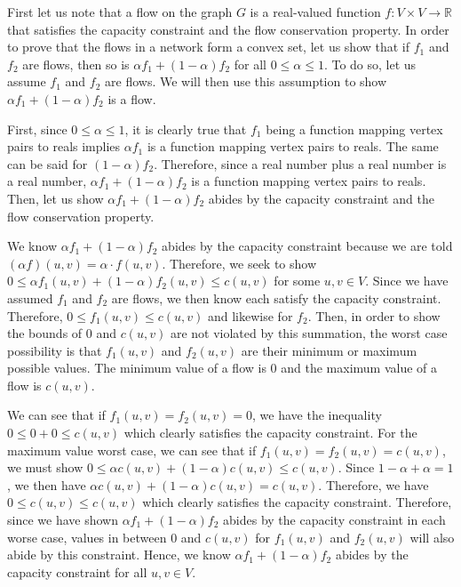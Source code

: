 \documentclass[11pt]{article}
\begin{document}
First let us note that a flow on the graph $G$ is a real-valued function $f : V \times V \rightarrow \mathbb{R}$ that satisfies the capacity constraint and the flow conservation property. In order to prove that the flows in a network form a convex set, let us show that if $f_1$ and $f_2$ are flows, then so is $\alpha f_1 + (1-\alpha) f_2$ for all $0 \leq \alpha \leq 1$. To do so, let us assume $f_1$ and $f_2$ are flows. We will then use this assumption to show $\alpha f_1 + (1-\alpha) f_2$ is a flow.

First, since $0 \leq \alpha \leq 1$, it is clearly true that $f_1$ being a function mapping vertex pairs to reals implies $\alpha f_1$ is a function mapping vertex pairs to reals. The same can be said for $(1-\alpha)f_2$. Therefore, since a real number plus a real number is a real number, $\alpha f_1 + (1-\alpha) f_2$ is a function mapping vertex pairs to reals. Then, let us show $\alpha f_1 + (1-\alpha) f_2$ abides by the capacity constraint and the flow conservation property.

We know $\alpha f_1 + (1-\alpha) f_2$ abides by the capacity constraint because we are told $(\alpha f)(u,v) = \alpha \cdot f(u,v)$. Therefore, we seek to show $0 \leq \alpha f_1(u,v) + (1-\alpha)f_2(u,v) \leq c(u,v)$ for some $u,v \in V$. Since we have assumed $f_1$ and $f_2$ are flows, we then know each satisfy the capacity constraint. Therefore, $0 \leq f_1(u,v) \leq c(u,v)$ and likewise for $f_2$. Then, in order to show the bounds of 0 and $c(u,v)$ are not violated by this summation, the worst case possibility is that $f_1(u,v)$ and $f_2(u,v)$ are their minimum or maximum possible values. The minimum value of a flow is 0 and the maximum value of a flow is $c(u,v)$.

We can see that if $f_1(u,v) = f_2(u,v) = 0$, we have the inequality $0 \leq 0 + 0 \leq c(u,v)$ which clearly satisfies the capacity constraint. For the maximum value worst case, we can see that if $f_1(u,v) = f_2(u,v) = c(u,v)$, we must show $0 \leq \alpha c(u,v) + (1-\alpha)c(u,v) \leq c(u,v)$. Since $1 - \alpha + \alpha = 1$, we then have $\alpha c(u,v) + (1-\alpha)c(u,v) = c(u,v)$. Therefore, we have $0 \leq c(u,v) \leq c(u,v)$ which clearly satisfies the capacity constraint. Therefore, since we have shown $\alpha f_1 + (1-\alpha) f_2$ abides by the capacity constraint in each worse case, values in between 0 and $c(u,v)$ for $f_1(u,v)$ and $f_2(u,v)$ will also abide by this constraint. Hence, we know $\alpha f_1 + (1-\alpha) f_2$ abides by the capacity constraint for all $u,v \in V$.
\end{document}
